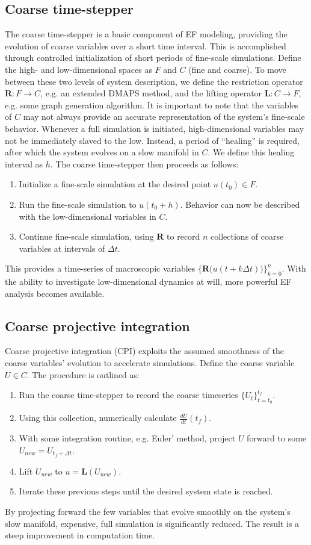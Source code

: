 \documentclass[11pt]{article}
\begin{document}
\subsection{Coarse time-stepper}
\indent The coarse time-stepper is a basic component of EF modeling, providing the evolution of coarse variables over a short time interval. This is accomplished through controlled initialization of short periods of fine-scale simulations. Define the high- and low-dimensional spaces as $F$ and $C$ (fine and coarse). To move between these two levels of system description, we define the restriction operator $\textbf{R}: F \rightarrow C$, e.g. an extended DMAPS method, and the lifting operator $\textbf{L}: C \rightarrow F$, e.g. some graph generation algorithm. It is important to note that the variables of $C$ may not always provide an accurate representation of the system's fine-scale behavior. Whenever a full simulation is initiated, high-dimensional variables may not be immediately slaved to the low. Instead, a period of ``healing'' is required, after which the system evolves on a slow manifold in $C$. We define this healing interval as $h$. The coarse time-stepper then proceeds as follows:
\begin{enumerate}
\item Initialize a fine-scale simulation at the desired point $u(t_{0}) \in F$.
\item Run the fine-scale simulation to $u(t_{0}+h)$. Behavior can now be described with the low-dimensional variables in $C$.
\item Continue fine-scale simulation, using $\textbf{R}$ to record $n$ collections of coarse variables at intervals of $\Delta t$. 
\end{enumerate}
This provides a time-series of macroscopic variables $\{ \textbf{R(}u(t+k\Delta t) \textbf{)} \}_{k=0}^{n}$. With the ability to investigate low-dimensional dynamics at will, more powerful EF analysis becomes available.
\subsection{Coarse projective integration}
\indent Coarse projective integration (CPI) exploits the assumed smoothness of the coarse variables' evolution to accelerate simulations. Define the coarse variable $U \in C$. The procedure is outlined as:
\begin{enumerate}
\item Run the coarse time-stepper to record the coarse timeseries $\{ U_{t} \}_{t=t_{0}}^{t_{f}}$.
\item Using this collection, numerically calculate $\frac{dU}{dt}(t_{f})$.
\item With some integration routine, e.g. Euler' method, project $U$ forward to some $U_{new} = U_{t_{f}+\Delta t}$.
\item Lift $U_{new}$ to $u = \textbf{L}(U_{new})$.
\item Iterate these previous steps until the desired system state is reached.
\end{enumerate}
By projecting forward the few variables that evolve smoothly on the system's slow manifold, expensive, full simulation is significantly reduced. The result is a steep improvement in computation time.
\end{document}
